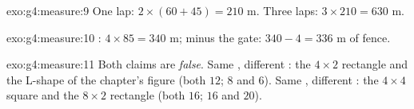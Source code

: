 \begin{solution}{exo:g4:measure:9}
One lap: $2 \times (60 + 45) = 210$ m. Three laps:
$3 \times 210 = 630$ m.
\end{solution}

\begin{solution}{exo:g4:measure:10}
: $4 \times 85 = 340$ m; minus the gate:
$340 - 4 = 336$ m of fence.
\end{solution}

\begin{solution}{exo:g4:measure:11}
Both claims are \emph{false}. Same , different : the
$4 \times 2$ rectangle and the L-shape of the chapter's figure (both
 $12$;  $8$ and $6$). Same , different
: the $4 \times 4$ square and the $8 \times 2$ rectangle
(both  $16$;  $16$ and $20$).
\end{solution}

